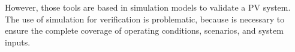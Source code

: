 \documentclass[journal]{IEEEtran}
\begin{document}
%
%



However, those tools are based in simulation models to validate a PV system. The use of simulation for verification is problematic, because is necessary to ensure the complete coverage of operating conditions, scenarios, and system inputs. 
\end{document}
